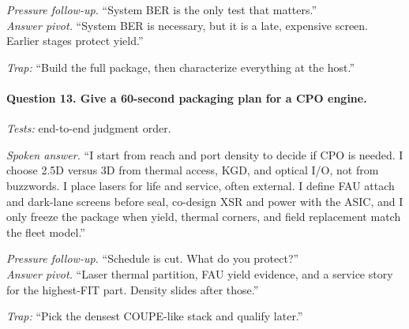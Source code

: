 \textit{Pressure follow-up.} ``System BER is the only test that matters.''\\
\textit{Answer pivot.} ``System BER is necessary, but it is a late, expensive
screen. Earlier stages protect yield.''

\textit{Trap:} ``Build the full package, then characterize everything at the
host.''

\paragraph{Question 13. Give a 60-second packaging plan for a CPO engine.}
\textit{Tests:} end-to-end judgment order.

\textit{Spoken answer.}
``I start from reach and port density to decide if CPO is needed. I choose
2.5D versus 3D from thermal access, KGD, and optical I/O, not from buzzwords.
I place lasers for life and service, often external. I define FAU attach and
dark-lane screens before seal, co-design XSR and power with the ASIC, and I
only freeze the package when yield, thermal corners, and field replacement
match the fleet model.''

\textit{Pressure follow-up.} ``Schedule is cut. What do you protect?''\\
\textit{Answer pivot.} ``Laser thermal partition, FAU yield evidence, and a
service story for the highest-FIT part. Density slides after those.''

\textit{Trap:} ``Pick the densest COUPE-like stack and qualify later.''
